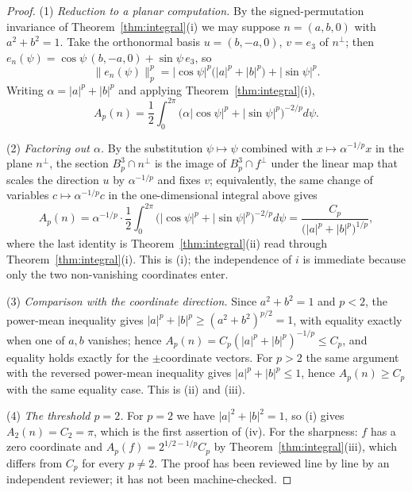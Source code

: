 \documentclass[11pt]{article}
\theoremstyle{plain}
\numberwithin{theorem}{section}
\begin{document}
\begin{proof}
(1) \emph{Reduction to a planar computation.} By the signed-permutation invariance of Theorem~\ref{thm:integral}(i) we may suppose $n=(a,b,0)$ with $a^2+b^2=1$. Take the orthonormal basis $u=(b,-a,0)$, $v=e_3$ of $n^{\perp}$; then $e_n(\psi)=\cos\psi\,(b,-a,0)+\sin\psi\,e_3$, so
\[
\big\|e_n(\psi)\big\|_p^p=|\cos\psi|^p\big(|a|^p+|b|^p\big)+|\sin\psi|^p .
\]
Writing $\alpha=|a|^p+|b|^p$ and applying Theorem~\ref{thm:integral}(i),
\[
A_p(n)=\frac12\int_0^{2\pi}\big(\alpha|\cos\psi|^p+|\sin\psi|^p\big)^{-2/p}d\psi .
\]

(2) \emph{Factoring out $\alpha$.} By the substitution $\psi\mapsto\psi$ combined with $x\mapsto\alpha^{-1/p}x$ in the plane $n^{\perp}$, the section $B_p^3\cap n^{\perp}$ is the image of $B_p^3\cap f^{\perp}$ under the linear map that scales the direction $u$ by $\alpha^{-1/p}$ and fixes $v$; equivalently, the same change of variables $c\mapsto\alpha^{-1/p}c$ in the one-dimensional integral above gives
\[
A_p(n)=\alpha^{-1/p}\cdot\frac12\int_0^{2\pi}\big(|\cos\psi|^p+|\sin\psi|^p\big)^{-2/p}d\psi=\frac{C_p}{\big(|a|^p+|b|^p\big)^{1/p}},
\]
where the last identity is Theorem~\ref{thm:integral}(ii) read through Theorem~\ref{thm:integral}(i). This is (i); the independence of $i$ is immediate because only the two non-vanishing coordinates enter.

(3) \emph{Comparison with the coordinate direction.} Since $a^2+b^2=1$ and $p<2$, the power-mean inequality gives $|a|^p+|b|^p\ge(a^2+b^2)^{p/2}=1$, with equality exactly when one of $a,b$ vanishes; hence $A_p(n)=C_p(|a|^p+|b|^p)^{-1/p}\le C_p$, and equality holds exactly for the $\pm$coordinate vectors. For $p>2$ the same argument with the reversed power-mean inequality gives $|a|^p+|b|^p\le1$, hence $A_p(n)\ge C_p$ with the same equality case. This is (ii) and (iii).

(4) \emph{The threshold $p=2$.} For $p=2$ we have $|a|^2+|b|^2=1$, so (i) gives $A_2(n)=C_2=\pi$, which is the first assertion of (iv). For the sharpness: $f$ has a zero coordinate and $A_p(f)=2^{1/2-1/p}C_p$ by Theorem~\ref{thm:integral}(iii), which differs from $C_p$ for every $p\ne2$. The proof has been reviewed line by line by an independent reviewer; it has not been machine-checked.
\end{proof}
\end{document}
